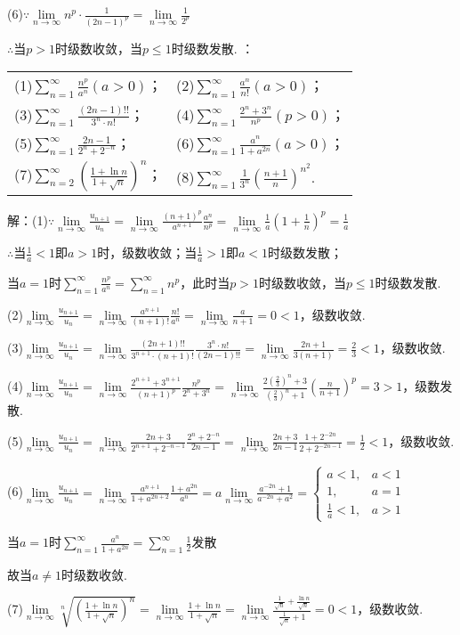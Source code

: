 \documentclass[12pt,UTF8]{ctexart}
\newcommand\Lim[0]{\lim\limits_{n\rightarrow\infty}}
\newcommand\Ser[1]{\sum_{n=#1}^\infty}
\begin{document}
\begin{enumerate}
(6)$\because\Lim n^p\cdot\frac1{(2n-1)^p}=\Lim\frac1{2^p}$

$\therefore$当$p>1$时级数收敛，当$p\leq1$时级数发散.
：
\newline
\begin{tabular}{ll}
(1)$\sum_{n=1}^\infty\frac{n^p}{a^n}(a>0)$；&(2)$\sum_{n=1}^\infty\frac{a^n}{n!}(a>0)$；\\
(3)$\sum_{n=1}^\infty\frac{(2n-1)!!}{3^n\cdot n!}$；&(4)$\Ser{1}\frac{2^n+3^n}{n^p}(p>0)$；\\
(5)$\Ser{1}\frac{2n-1}{2^n+2^{-n}}$；&(6)$\Ser{1}\frac{a^n}{1+a^{2n}}(a>0)$；\\
(7)$\Ser{2}(\frac{1+\ln n}{1+\sqrt n})^n$；&(8)$\Ser{1}\frac1{3^n}(\frac{n+1}n)^{n^2}$.
\end{tabular}

解：(1)$\because\Lim\frac{u_{n+1}}{u_n}=\Lim\frac{(n+1)^p}{a^{n+1}}\frac{a^n}{n^p}=\Lim\frac1a(1+\frac1n)^p=\frac1a$

$\therefore$当$\frac1a<1$即$a>1$时，级数收敛；当$\frac1a>1$即$a<1$时级数发散；

当$a=1$时$\Ser{1}\frac{n^p}{a^n}=\Ser{1}n^p$，此时当$p>1$时级数收敛，当$p\leq1$时级数发散.

(2)$\Lim\frac{u_{n+1}}{u_n}=\Lim\frac{a^{n+1}}{(n+1)!}\frac{n!}{a^n}=\Lim\frac a{n+1}=0<1$，级数收敛.

(3)$\Lim\frac{u_{n+1}}{u_n}=\Lim\frac{(2n+1)!!}{3^{n+1}\cdot(n+1)!}\frac{3^n\cdot n!}{(2n-1)!!}=\Lim\frac{2n+1}{3(n+1)}=\frac23<1$，级数收敛.

(4)$\Lim\frac{u_{n+1}}{u_n}=\Lim\frac{2^{n+1}+3^{n+1}}{(n+1)^p}\frac{n^p}{2^n+3^n}=\Lim\frac{2(\frac23)^n+3}{(\frac23)^n+1}(\frac n{n+1})^p=3>1$，级数发散.

(5)$\Lim\frac{u_{n+1}}{u_n}=\Lim\frac{2n+3}{2^{n+1}+2^{-n-1}}\frac{2^n+2^{-n}}{2n-1}=\Lim\frac{2n+3}{2n-1}\frac{1+2^{-2n}}{2+2^{-2n-1}}=\frac12<1$，级数收敛.

(6)$\Lim\frac{u_{n+1}}{u_n}=\Lim\frac{a^{n+1}}{1+a^{2n+2}}\frac{1+a^{2n}}{a^n}=a\Lim\frac{a^{-2n}+1}{a^{-2n}+a^2}=\begin{cases}
a<1,&a<1\\
1,&a=1\\
\frac1a<1,&a>1
\end{cases}$

当$a=1$时$\Ser{1}\frac{a^n}{1+a^{2n}}=\Ser{1}\frac12$发散

故当$a\neq1$时级数收敛.

(7)$\Lim\sqrt[n]{(\frac{1+\ln n}{1+\sqrt n})^n}=\Lim\frac{1+\ln n}{1+\sqrt n}=\Lim\frac{\frac1{\sqrt n}+\frac{\ln n}{\sqrt n}}{\frac1{\sqrt n}+1}=0<1$，级数收敛.


\end{enumerate}
\end{document}

